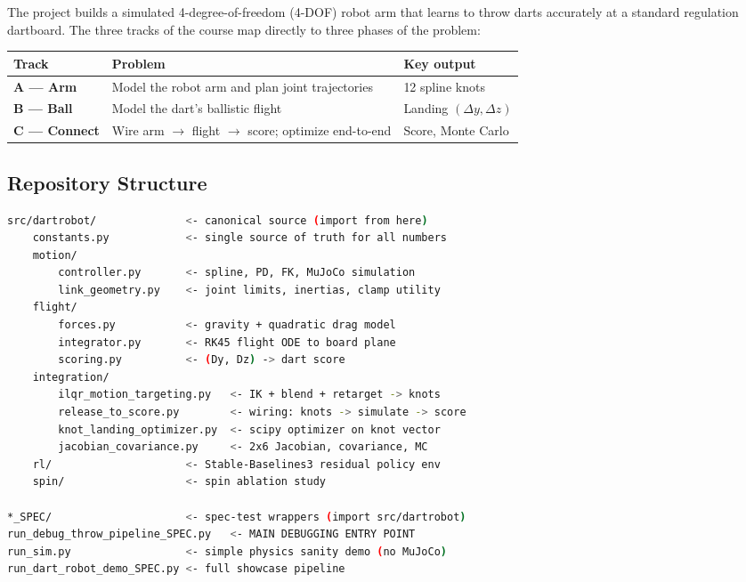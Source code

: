 \documentclass[11pt,letterpaper]{article}
\begin{document}
The project builds a simulated 4-degree-of-freedom (4-DOF) robot arm that learns to throw darts accurately at a standard regulation dartboard. The three tracks of the course map directly to three phases of the problem:

\begin{center}
\begin{tabular}{>{\bfseries}l l l}
\toprule
Track & Problem & Key output \\
\midrule
A — Arm & Model the robot arm and plan joint trajectories & 12 spline knots \\
B — Ball & Model the dart's ballistic flight & Landing $(\Delta y, \Delta z)$ \\
C — Connect & Wire arm $\to$ flight $\to$ score; optimize end-to-end & Score, Monte Carlo \\
\bottomrule
\end{tabular}
\end{center}

\subsection{Repository Structure}

\begin{lstlisting}[language=bash, numbers=none]
src/dartrobot/              <- canonical source (import from here)
    constants.py            <- single source of truth for all numbers
    motion/
        controller.py       <- spline, PD, FK, MuJoCo simulation
        link_geometry.py    <- joint limits, inertias, clamp utility
    flight/
        forces.py           <- gravity + quadratic drag model
        integrator.py       <- RK45 flight ODE to board plane
        scoring.py          <- (Dy, Dz) -> dart score
    integration/
        ilqr_motion_targeting.py   <- IK + blend + retarget -> knots
        release_to_score.py        <- wiring: knots -> simulate -> score
        knot_landing_optimizer.py  <- scipy optimizer on knot vector
        jacobian_covariance.py     <- 2x6 Jacobian, covariance, MC
    rl/                     <- Stable-Baselines3 residual policy env
    spin/                   <- spin ablation study

*_SPEC/                     <- spec-test wrappers (import src/dartrobot)
run_debug_throw_pipeline_SPEC.py   <- MAIN DEBUGGING ENTRY POINT
run_sim.py                  <- simple physics sanity demo (no MuJoCo)
run_dart_robot_demo_SPEC.py <- full showcase pipeline
\end{lstlisting}
\end{document}
